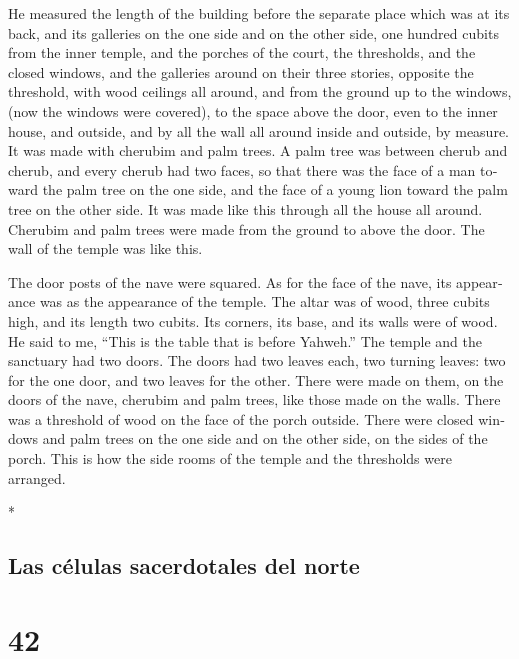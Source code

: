 \begin{paracol}{2}
\begin{otherlanguage}{english}
 He measured the length of the building before the
separate place which was at its back, and its galleries on the one side
and on the other side, one hundred cubits from the inner temple, and the
porches of the court,  the thresholds, and the closed
windows, and the galleries around on their three stories, opposite the
threshold, with wood ceilings all around, and from the ground up to the
windows, (now the windows were covered),  to the space
above the door, even to the inner house, and outside, and by all the
wall all around inside and outside, by measure.  It was
made with cherubim and palm trees. A palm tree was between cherub and
cherub, and every cherub had two faces,  so that there
was the face of a man toward the palm tree on the one side, and the face
of a young lion toward the palm tree on the other side. It was made like
this through all the house all around.  Cherubim and palm
trees were made from the ground to above the door. The wall of the
temple was like this.

 The door posts of the nave were squared. As for the face
of the nave, its appearance was as the appearance of the temple.
 The altar was of wood, three cubits high, and its length
two cubits. Its corners, its base, and its walls were of wood. He said
to me, ``This is the table that is before Yahweh.''  The
temple and the sanctuary had two doors.  The doors had
two leaves each, two turning leaves: two for the one door, and two
leaves for the other.  There were made on them, on the
doors of the nave, cherubim and palm trees, like those made on the
walls. There was a threshold of wood on the face of the porch outside.
 There were closed windows and palm trees on the one side
and on the other side, on the sides of the porch. This is how the side
rooms of the temple and the thresholds were arranged.

\end{otherlanguage}

\switchcolumn[0]*

\hypertarget{las-cuxe9lulas-sacerdotales-del-norte}{%
\subsection{Las células sacerdotales del
norte}\label{las-cuxe9lulas-sacerdotales-del-norte}}

\hypertarget{section-82}{%
\section{42}\label{section-82}}


\end{paracol}
